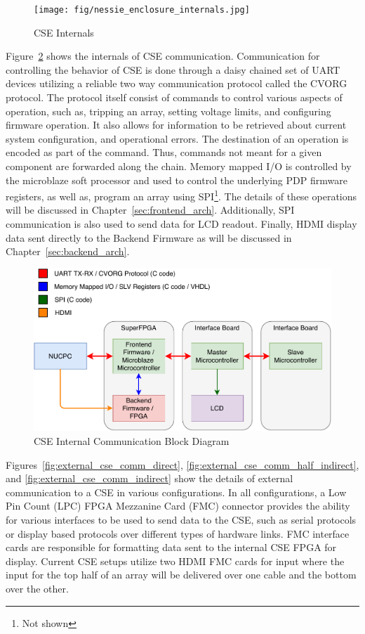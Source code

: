     \begin{figure}
        \centering
        \texttt{[image: fig/nessie\_enclosure\_internals.jpg]}
        \caption{CSE Internals}
        \label{fig:nessie_enclosure_internals}
    \end{figure}

    Figure~\ref{fig:cse_comm_block} shows the internals of CSE communication. Communication for controlling the behavior of CSE is done through a daisy chained set of UART devices utilizing a reliable two way communication protocol called the CVORG protocol. The protocol itself consist of commands to control various aspects of operation, such as, tripping an array, setting voltage limits, and configuring firmware operation. It also allows for information to be retrieved about current system configuration, and operational errors. The destination of an operation is encoded as part of the command. Thus, commands not meant for a given component are forwarded along the chain. Memory mapped I/O is controlled by the microblaze soft processor and used to control the underlying PDP firmware registers, as well as, program an array using SPI\footnote{Not shown}. The details of these operations will be discussed in Chapter~\ref{sec:frontend_arch}. Additionally, SPI communication is also used to send data for LCD readout. Finally, HDMI display data sent directly to the Backend Firmware as will be discussed in Chapter~\ref{sec:backend_arch}.

    \begin{figure}
        \centering
        \includegraphics[width=1.0\textwidth]{fig/cse_comm_block}
        \caption{CSE Internal Communication Block Diagram}
        \label{fig:cse_comm_block}
    \end{figure}

    Figures~\ref{fig:external_cse_comm_direct}, \ref{fig:external_cse_comm_half_indirect}, and \ref{fig:external_cse_comm_indirect} show the details of external communication to a CSE in various configurations. In all configurations, a Low Pin Count (LPC) FPGA Mezzanine Card (FMC) connector provides the ability for various interfaces to be used to send data to the CSE, such as serial protocols or display based protocols over different types of hardware links. FMC interface cards are responsible for formatting data sent to the internal CSE FPGA for display. Current CSE setups utilize two HDMI FMC cards for input where the input for the top half of an array will be delivered over one cable and the bottom over the other.

